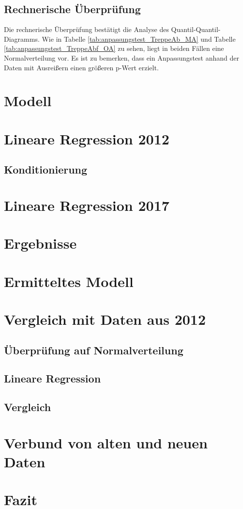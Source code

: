 \subsection{Rechnerische Überprüfung}
Die rechnerische Überprüfung bestätigt die Analyse des Quantil-Quantil-Diagramms. Wie in Tabelle \ref{tab:anpassungstest_TreppeAb_MA} und Tabelle \ref{tab:anpassungstest_TreppeAbf_OA} zu sehen, liegt in beiden Fällen eine Normalverteilung vor. Es ist zu bemerken, dass ein Anpassungstest anhand der Daten mit Ausreißern einen größeren p-Wert erzielt. 


\section{Modell}

\section{Lineare Regression 2012}


\subsection{Konditionierung}

\section{Lineare Regression 2017}


\section{Ergebnisse}
\section{Ermitteltes Modell}

\section{Vergleich mit Daten aus 2012}
\subsection{Überprüfung auf Normalverteilung}
\subsection{Lineare Regression}
\subsection{Vergleich}

\section{Verbund von alten und neuen Daten}

\section{Fazit}


